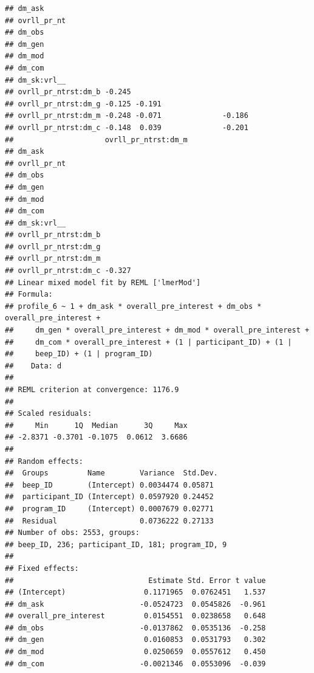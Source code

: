 \documentclass[]{msu-thesis}
\theoremstyle{definition}
\theoremstyle{definition}
\theoremstyle{definition}
\theoremstyle{remark}
\begin{document}
\begin{verbatim}
## dm_ask                                                            
## ovrll_pr_nt                                                       
## dm_obs                                                            
## dm_gen                                                            
## dm_mod                                                            
## dm_com                                                            
## dm_sk:vrl__                                                       
## ovrll_pr_ntrst:dm_b -0.245                                        
## ovrll_pr_ntrst:dm_g -0.125 -0.191                                 
## ovrll_pr_ntrst:dm_m -0.248 -0.071              -0.186             
## ovrll_pr_ntrst:dm_c -0.148  0.039              -0.201             
##                     ovrll_pr_ntrst:dm_m
## dm_ask                                 
## ovrll_pr_nt                            
## dm_obs                                 
## dm_gen                                 
## dm_mod                                 
## dm_com                                 
## dm_sk:vrl__                            
## ovrll_pr_ntrst:dm_b                    
## ovrll_pr_ntrst:dm_g                    
## ovrll_pr_ntrst:dm_m                    
## ovrll_pr_ntrst:dm_c -0.327             
## Linear mixed model fit by REML ['lmerMod']
## Formula: 
## profile_6 ~ 1 + dm_ask * overall_pre_interest + dm_obs * overall_pre_interest +  
##     dm_gen * overall_pre_interest + dm_mod * overall_pre_interest +  
##     dm_com * overall_pre_interest + (1 | participant_ID) + (1 |  
##     beep_ID) + (1 | program_ID)
##    Data: d
## 
## REML criterion at convergence: 1176.9
## 
## Scaled residuals: 
##     Min      1Q  Median      3Q     Max 
## -2.8371 -0.3701 -0.1075  0.0612  3.6686 
## 
## Random effects:
##  Groups         Name        Variance  Std.Dev.
##  beep_ID        (Intercept) 0.0034474 0.05871 
##  participant_ID (Intercept) 0.0597920 0.24452 
##  program_ID     (Intercept) 0.0007679 0.02771 
##  Residual                   0.0736222 0.27133 
## Number of obs: 2553, groups:  
## beep_ID, 236; participant_ID, 181; program_ID, 9
## 
## Fixed effects:
##                               Estimate Std. Error t value
## (Intercept)                  0.1171965  0.0762451   1.537
## dm_ask                      -0.0524723  0.0545826  -0.961
## overall_pre_interest         0.0154551  0.0238658   0.648
## dm_obs                      -0.0137862  0.0535136  -0.258
## dm_gen                       0.0160853  0.0531793   0.302
## dm_mod                       0.0250659  0.0557612   0.450
## dm_com                      -0.0021346  0.0553096  -0.039

\end{verbatim}
\end{document}
